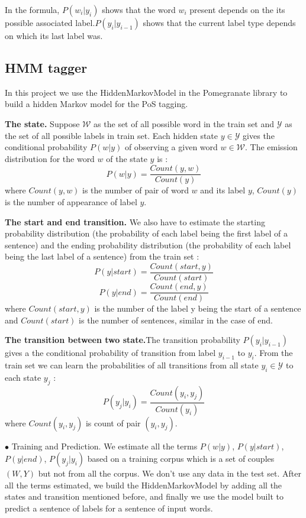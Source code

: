 \documentclass{article}
\def\WW{{\mathcal{W}}}
\def\YY{{\mathcal{Y}}}
\begin{document}
In the formula, $P(w_i|y_i)$ shows that the word $w_i$ present depends on the its possible associated label.$P(y_i|y_{i-1})$ shows that the current label type depends on which its last label was.

\subsection{HMM tagger}
In this project we use the HiddenMarkovModel in the Pomegranate library to build a hidden Markov model for the PoS tagging.

\textbf{The state.} Suppose $\WW$ as the set of all possible word in the train set and $\YY$ as the set of all possible labels in train set. Each hidden state $y \in \YY$ gives the conditional probability $P(w|y)$ of observing a given word $w \in \WW$. The emission distribution for the word $w$ of the state $y$ is : $$P(w|y) = \frac{Count(y,w)}{Count(y)}$$ where $Count(y,w)$ is the number of pair of word $w$ and its label $y$, $Count(y)$ is the number of appearance of label $y$.

\textbf{The start and end transition.} We also have to estimate the starting probability distribution (the probability of each label being the first label of a sentence) and the ending probability distribution (the probability of each label being the last label of a sentence) from the train set : $$P(y|start) = \frac{Count(start, y)}{Count(start)}$$ 
$$P(y|end) = \frac{Count(end, y)}{Count(end)}$$ where $Count(start, y)$ is the number of the label y being the start of a sentence and $Count(start)$ is the number of sentences, similar in the case of end.

\textbf{The transition between two state.}The transition probability $P(y_i|y_{i-1})$ gives a the conditional probability of transition from label $y_{i-1}$ to $y_i$. From the train set we can learn the probabilities of all transitions from all state $y_i \in \YY$ to each state $y_j$ :
$$P(y_j|y_i) = \frac{Count(y_i, y_j)}{Count(y_i)}$$ where $Count(y_i, y_j)$ is count of pair $(y_i, y_j)$.

$\bullet$ Training and Prediction. We estimate all the terms $P(w|y)$, $P(y|start)$, $P(y|end)$, $P(y_j|y_i)$ based on a training corpus which is a set of couples $(W, Y)$ but not from all the corpus. We don't use any data in the test set. After all the terms estimated, we build the HiddenMarkovModel by adding all the states and transition mentioned before, and finally we use the model built to predict a sentence of labels for a sentence of input words.
\end{document}

